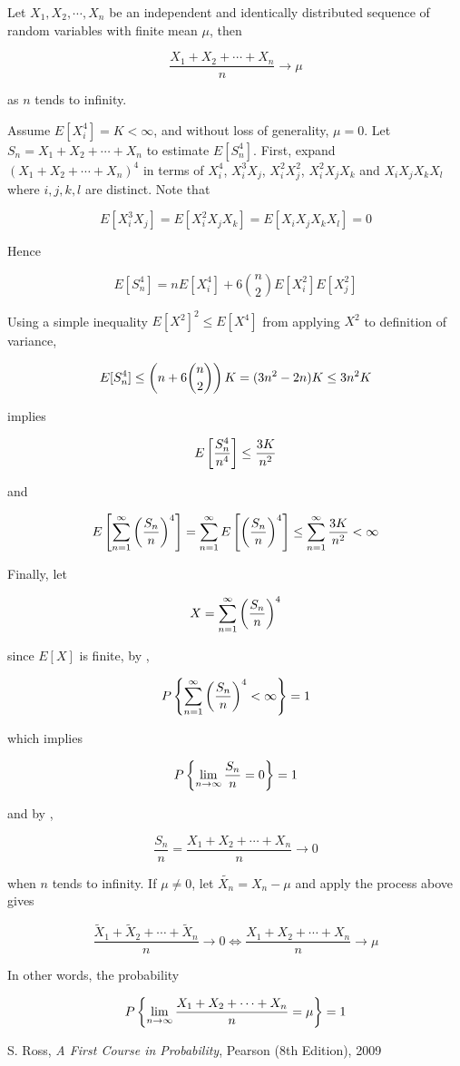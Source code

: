 \documentclass[a4paper,12pt]{article}
\begin{document}
\begin{thm}
  Let $X_{1},X_{2},\cdots,X_{n}$ be an independent and identically distributed sequence of random variables with finite mean $\mu$, then

  $$\frac{X_{1}+X_{2}+\cdots+X_{n}}{n}\to\mu$$\s

  as $n$ tends to infinity.\n

  \prf Assume $E[X_{i}^{4}]=K<\infty$, and without loss of generality, $\mu=0$. Let $S_{n}=X_{1}+X_{2}+\cdots+X_{n}$ to estimate $E[S_{n}^{4}]$. First, expand $(X_{1}+X_{2}+\cdots+X_{n})^{4}$ in terms of $X_{i}^{4}$, $X_{i}^{3}X_{j}$, $X_{i}^{2}X_{j}^{2}$, $X_{i}^{2}X_{j}X_{k}$ and $X_{i}X_{j}X_{k}X_{l}$ where $i,j,k,l$ are distinct. Note that

  $$E[X_{i}^{3}X_{j}]=E[X_{i}^{2}X_{j}X_{k}]=E[X_{i}X_{j}X_{k}X_{l}]=0$$\s

  Hence

  $$E[S_{n}^{4}]=nE[X_{i}^{4}]+6\binom{n}{2}E[X_{i}^{2}]E[X_{j}^{2}]$$\s

  Using a simple inequality $E[X^{2}]^{2}\leq E[X^{4}]$ from applying $X^{2}$ to definition of variance,

  $$E[S_{n}^{4}]\leq\left( n+6\binom{n}{2}\right)K=(3n^{2}-2n)K\leq 3n^{2}K$$\s

  implies

  $$E\left[ \frac{S_{n}^{4}}{n^{4}}\right]\leq\frac{3K}{n^{2}}$$\s

  and

  $$E\left[ \sum_{n=1}^{\infty}\left( \frac{S_{n}}{n}\right)^{4}\right]=\sum_{n=1}^{\infty}E\left[ \left( \frac{S_{n}}{n}\right)^{4}\right]\leq\sum_{n=1}^{\infty}\frac{3K}{n^{2}}<\infty$$\s

  Finally, let
  
  $$X=\sum_{n=1}^{\infty}\left( \frac{S_{n}}{n}\right)^{4}$$\s
  
  since $E[X]$ is finite, by \rpst[\sctr{1}],

  $$P\left\{ \sum_{n=1}^{\infty}\left( \frac{S_{n}}{n}\right)^{4}<\infty\right\}=1$$\s

  which implies

  $$P\left\{ \lim_{n\to\infty}\frac{S_{n}}{n}=0\right\}=1$$\s

  and by \rpst[\sctr{6}],

  $$\frac{S_{n}}{n}=\frac{X_{1}+X_{2}+\cdots+X_{n}}{n}\to 0$$\s

  when $n$ tends to infinity. If $\mu\neq 0$, let $\tilde{X_{n}}=X_{n}-\mu$ and apply the process above gives

  $$\frac{\tilde{X}_{1}+\tilde{X}_{2}+\cdots+\tilde{X}_{n}}{n}\to 0\Leftrightarrow\frac{X_{1}+X_{2}+\cdots+X_{n}}{n}\to\mu$$
\end{thm}\n

In other words, the probability

$$P\left\{ \lim_{n\to\infty}\frac{X_{1}+X_{2}+\cdots+X_{n}}{n}=\mu\right\}=1$$



\begin{reflist}
  \item S. Ross, \textit{A First Course in Probability}, Pearson (8th Edition), 2009
\end{reflist}
\end{document}
